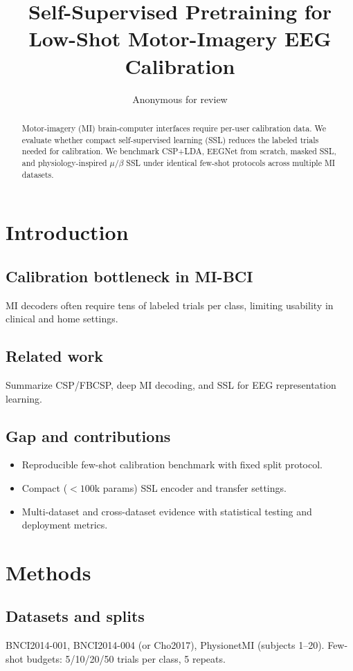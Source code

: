 \documentclass[11pt]{article}
\title{Self-Supervised Pretraining for Low-Shot Motor-Imagery EEG Calibration}
\author{Anonymous for review}
\date{}
\begin{document}
\maketitle

\begin{abstract}
Motor-imagery (MI) brain-computer interfaces require per-user calibration data. We evaluate whether compact self-supervised learning (SSL) reduces the labeled trials needed for calibration. We benchmark CSP+LDA, EEGNet from scratch, masked SSL, and physiology-inspired $\mu/\beta$ SSL under identical few-shot protocols across multiple MI datasets.
\end{abstract}

\section{Introduction}
\subsection{Calibration bottleneck in MI-BCI}
MI decoders often require tens of labeled trials per class, limiting usability in clinical and home settings.
\subsection{Related work}
Summarize CSP/FBCSP, deep MI decoding, and SSL for EEG representation learning.
\subsection{Gap and contributions}
\begin{itemize}
\item Reproducible few-shot calibration benchmark with fixed split protocol.
\item Compact (\(<100\)k params) SSL encoder and transfer settings.
\item Multi-dataset and cross-dataset evidence with statistical testing and deployment metrics.
\end{itemize}

\section{Methods}
\subsection{Datasets and splits}
BNCI2014-001, BNCI2014-004 (or Cho2017), PhysionetMI (subjects 1--20). Few-shot budgets: 5/10/20/50 trials per class, 5 repeats.
\end{document}
